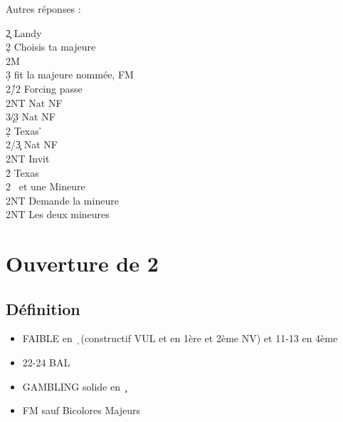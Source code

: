 \documentclass[a4paper]{article}
\begin{document}
Autres réponses :

\begin{bidtable}
2\c \> Landy\+\\
2\d \> Choisis ta majeure\+\\
2M\+\\
3\d \> fit la majeure nommée, FM\-\-\\
2\h/2\s \> Forcing passe\\
2NT \> Nat NF\\
3\c/3\d \> Nat NF\-\\
2\d \> Texas \h \+\\
2\s/3\c \> Nat NF\\
2NT \> Invit\-\\
2\h \> Texas \s \\
2\s \> \s\ et une Mineure\+\\
2NT \> Demande la mineure\-\\
2NT \> Les deux mineures
\end{bidtable}

\section{Ouverture de 2\pdfc}

\subsection{Définition}

\begin{itemize}
\item FAIBLE en \d\ (constructif VUL et en 1ère et 2ème NV) et 11-13 en 4ème

\item 22-24 BAL

\item GAMBLING solide en \c\ 

\item FM sauf Bicolores Majeurs

\end{itemize}
\end{document}
